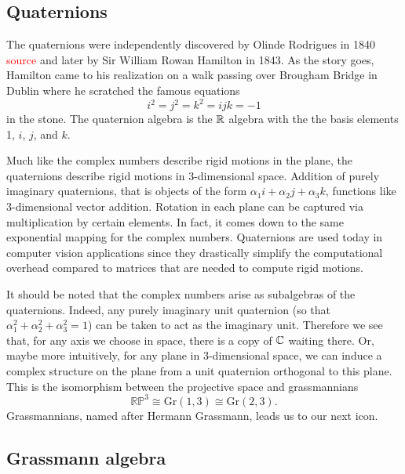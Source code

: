\documentclass[12pt]{article}
\begin{document}
\subsection{Quaternions}

The quaternions were independently discovered by Olinde Rodrigues in 1840 \textcolor{red}{source} and later by Sir William Rowan Hamilton in 1843. As the story goes, Hamilton came to his realization on a walk passing over Brougham Bridge in Dublin where he scratched the famous equations
\begin{equation}
\label{eq:hamiltons}
i^2=j^2=k^2=ijk=-1
\end{equation}
in the stone. The quaternion algebra is the $\mathbb{R}$ algebra with the the basis elements 1, $i$, $j$, and $k$.

Much like the complex numbers describe rigid motions in the plane, the quaternions describe rigid motions in 3-dimensional space. Addition of purely imaginary quaternions, that is objects of the form $\alpha_1 i + \alpha_2 j + \alpha_3 k$, functions like 3-dimensional vector addition. Rotation in each plane can be captured via multiplication by certain elements. In fact, it comes down to the same exponential mapping for the complex numbers. Quaternions are used today in computer vision applications since they drastically simplify the computational overhead compared to matrices that are needed to compute rigid motions. 

It should be noted that the complex numbers arise as subalgebras of the quaternions. Indeed, any purely imaginary unit quaternion (so that $\alpha_1^2+\alpha_2^2+\alpha_3^2=1$) can be taken to act as the imaginary unit. Therefore we see that, for any axis we choose in space, there is a copy of $\mathbb{C}$ waiting there. Or, maybe more intuitively, for any plane in 3-dimensional space, we can induce a complex structure on the plane from a unit quaternion orthogonal to this plane. This is the isomorphism between the projective space and grassmannians 
\begin{equation}
\label{eq:isomorphisms}
\mathbb{RP}^3\cong \mathrm{Gr}(1,3)\cong \mathrm{Gr}(2,3).
\end{equation}
Grassmannians, named after Hermann Grassmann, leads us to our next icon.


\subsection{Grassmann algebra}
\end{document}
